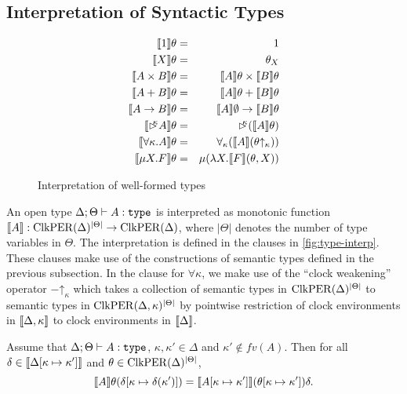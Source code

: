 \subsection{Interpretation of Syntactic Types}\label{sec:type-interp}

\begin{figure}[t]
  \centering
  \begin{eqnarray*}
    \llbracket 1 \rrbracket\theta & = & 1 \\
    \llbracket X \rrbracket\theta & = & \theta_X \\
    \llbracket A \times B \rrbracket\theta & = & \llbracket A \rrbracket\theta \times \llbracket B \rrbracket\theta \\
    \llbracket A + B \rrbracket\theta & = & \llbracket A \rrbracket\theta + \llbracket B \rrbracket\theta \\
    \llbracket A \to B \rrbracket\theta & = & \llbracket A \rrbracket\emptyset \to \llbracket B \rrbracket\theta \\
    \llbracket \mathord{\rhd\kern-0.4em^{\kappa}} A \rrbracket\theta & = & \mathord{\rhd\kern-0.4em^{\kappa}} (\llbracket A \rrbracket\theta) \\
    \llbracket \forall \kappa. A \rrbracket\theta & = & \forall_\kappa (\llbracket A \rrbracket(\theta\mathord\uparrow_\kappa)) \\
    \llbracket \mu X. F \rrbracket\theta & = & \mu (\lambda X. \llbracket F \rrbracket(\theta, X))
  \end{eqnarray*}
  \caption{Interpretation of well-formed types}
  \label{fig:type-interp}
\end{figure}

An open type $\Delta; \Theta \vdash A : \texttt{type}$ is interpreted as
monotonic function $\llbracket A \rrbracket : \mathrm{ClkPER}(\Delta)^{|\Theta|} \to
\mathrm{ClkPER}(\Delta)$, where $|\Theta|$ denotes the number of type
variables in $\Theta$. The interpretation is defined in the clauses in
\autoref{fig:type-interp}. These clauses make use of the constructions
of semantic types defined in the previous subsection. In the clause
for $\forall \kappa$, we make use of the ``clock weakening'' operator
$-\mathord\uparrow_\kappa$ which takes a collection of semantic types
in $\mathrm{ClkPER}(\Delta)^{|\Theta|}$ to semantic types in
$\mathrm{ClkPER}(\Delta,\kappa)^{|\Theta|}$ by pointwise restriction of clock
environments in $\llbracket \Delta, \kappa \rrbracket$ to clock environments in
$\llbracket \Delta \rrbracket$.

\begin{lemma}\label{lem:substitution-lemma}
  Assume that $\Delta; \Theta \vdash A : \texttt{type}$, $\kappa, \kappa'
  \in \Delta$ and $\kappa' \not\in \mathit{fv}(A)$. Then for all
  $\delta \in \llbracket \Delta[\kappa\mapsto\kappa'] \rrbracket$ and $\theta \in
  \mathrm{ClkPER}(\Delta)^{|\Theta|}$,
  \begin{displaymath}
    \llbracket A \rrbracket\theta (\delta[\kappa \mapsto \delta(\kappa')]) = \llbracket A[\kappa\mapsto\kappa'] \rrbracket(\theta[\kappa\mapsto\kappa'])\delta.
  \end{displaymath}
\end{lemma}

